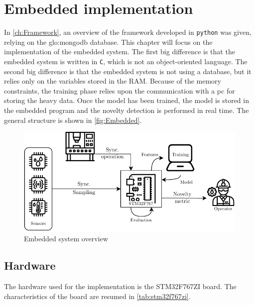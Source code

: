 \chapter{Embedded implementation}
\label{ch:Embedded}
In \autoref{ch:Framework}, an overview of the framework developed in \texttt{python} was given, relying on the \gls{glo:mongodb} database. This chapter will focus on the implementation of the embedded system. The first big difference is that the embedded system is written in \texttt{C}, which is not an object-oriented language. The second big difference is that the embedded system is not using a database, but it relies only on the variables stored in the RAM. Because of the memory constraints, the training phase relies upon the communication with a \gls{pc} for storing the heavy data. Once the model has been trained, the model is stored in the embedded program and the novelty detection is performed in real time. The general structure is shown in \autoref{fig:Embedded}.

\begin{figure}
    \centering
    \includegraphics[scale=1]{images/Embedded/EmbeddedStructure.pdf}
    \caption{Embedded system overview}
    \label{fig:Embedded}
\end{figure}


\section{Hardware}
The hardware used for the implementation is the STM32F767ZI board. The characteristics of the board are resumed in \autoref{tab:stm32f767zi}.



